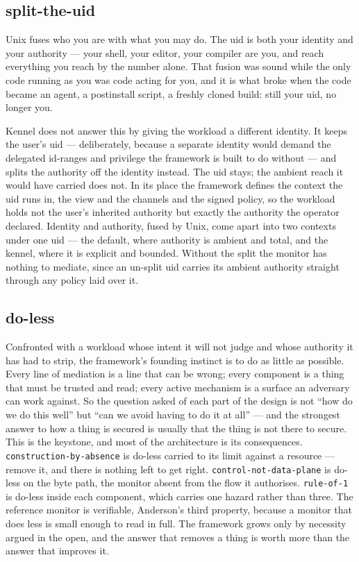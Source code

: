\hypertarget{split-the-uid}{%
\subsection{\texorpdfstring{split-the-uid}{split-the-uid}}\label{split-the-uid}}

Unix fuses who you are with what you may do. The uid is both your
identity and your authority --- your shell, your editor, your compiler
are you, and reach everything you reach by the number alone. That fusion
was sound while the only code running as you was code acting for you,
and it is what broke when the code became an agent, a postinstall
script, a freshly cloned build: still your uid, no longer you.

Kennel does not answer this by giving the workload a different identity.
It keeps the user's uid --- deliberately, because a separate identity
would demand the delegated id-ranges and privilege the framework is
built to do without --- and splits the authority off the identity
instead. The uid stays; the ambient reach it would have carried does
not. In its place the framework defines the context the uid runs in, the
view and the channels and the signed policy, so the workload holds not
the user's inherited authority but exactly the authority the operator
declared. Identity and authority, fused by Unix, come apart into two
contexts under one uid --- the default, where authority is ambient and
total, and the kennel, where it is explicit and bounded. Without the
split the monitor has nothing to mediate, since an un-split uid carries
its ambient authority straight through any policy laid over it.

\hypertarget{do-less}{%
\subsection{\texorpdfstring{do-less}{do-less}}\label{do-less}}

Confronted with a workload whose intent it will not judge and whose
authority it has had to strip, the framework's founding instinct is to
do as little as possible. Every line of mediation is a line that can be
wrong; every component is a thing that must be trusted and read; every
active mechanism is a surface an adversary can work against. So the
question asked of each part of the design is not ``how do we do this
well'' but ``can we avoid having to do it at all'' --- and the strongest
answer to how a thing is secured is usually that the thing is not there
to secure. This is the keystone, and most of the architecture is its
consequences. \texttt{construction-by-absence} is do-less carried to its
limit against a resource --- remove it, and there is nothing left to get
right. \texttt{control-not-data-plane} is do-less on the byte path, the
monitor absent from the flow it authorises. \texttt{rule-of-1} is
do-less inside each component, which carries one hazard rather than
three. The reference monitor is verifiable, Anderson's third property,
because a monitor that does less is small enough to read in full. The
framework grows only by necessity argued in the open, and the answer
that removes a thing is worth more than the answer that improves it.

